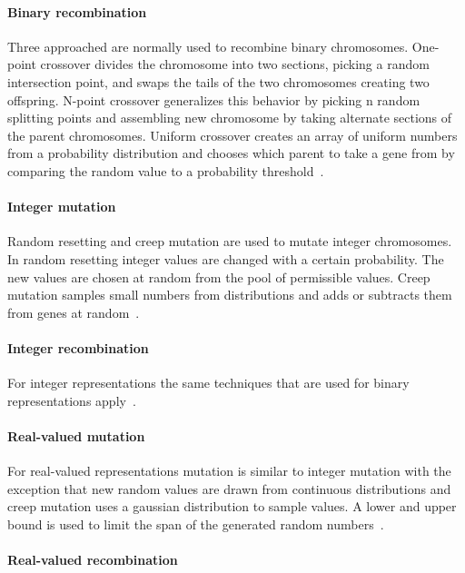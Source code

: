 \paragraph{Binary recombination}

Three approached are normally used to recombine binary chromosomes. One-point crossover divides the chromosome into two sections, picking a random intersection point, and swaps the tails of the two chromosomes creating two offspring. N-point crossover generalizes this behavior by picking n random splitting points and assembling new chromosome by taking alternate sections of the parent chromosomes. Uniform crossover creates an array of uniform numbers from a probability distribution and chooses which parent to take a gene from by comparing the random value to a probability threshold~\cite{Eiben201511}.

\paragraph{Integer mutation}

Random resetting and creep mutation are used to mutate integer chromosomes. In random resetting integer values are changed with a certain probability. The new values are chosen at random from the pool of permissible values. Creep mutation samples small numbers from distributions and adds or subtracts them from genes at random~\cite{Eiben201511}.

\paragraph{Integer recombination}

For integer representations the same techniques that are used for binary representations apply~\cite{Eiben201511}.


\paragraph{Real-valued mutation}

For real-valued representations mutation is similar to integer mutation with the exception that new random values are drawn from continuous distributions and creep mutation uses a gaussian distribution to sample values. A lower and upper bound is used to limit the span of the generated random numbers~\cite{Eiben201511}.

\paragraph{Real-valued recombination}

